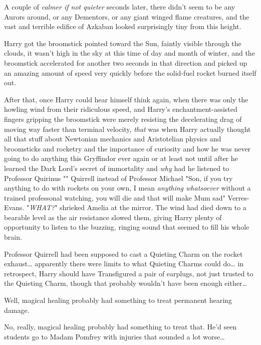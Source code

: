A couple of \emph{calmer if not quieter} seconds later, there didn't seem to be 
any Aurors around, or any Dementors, or any giant winged flame creatures, and 
the vast and terrible edifice of Azkaban looked surprisingly tiny from this 
height.

Harry got the broomstick pointed toward the Sun, faintly visible through the 
clouds, it wasn't high in the sky at this time of day and month of winter, and 
the broomstick accelerated for another two seconds in that direction and picked 
up an amazing amount of speed very quickly before the solid-fuel rocket burned 
itself out.

After that, once Harry could hear himself think again, when there was only the 
howling wind from their ridiculous speed, and Harry's enchantment-assisted 
fingers gripping the broomstick were merely resisting the decelerating drag of 
moving way faster than terminal velocity, \emph{that} was when Harry actually 
thought all that stuff about Newtonian mechanics and Aristotelian physics and 
broomsticks and rocketry and the importance of curiosity and how he was never 
going to do anything this Gryffindor ever again or at least not until after he 
learned the Dark Lord's secret of immortality and \emph{why} had he listened to 
Professor Quirinus "" Quirrell instead of Professor Michael 
"Son, if you try anything to do with rockets on your own, I mean \emph{anything 
whatsoever} without a trained professonal watching, you will die and that will 
make Mum sad" Verres-Evans.
\sbreak
"\emph{WHAT?}" shrieked Amelia at the mirror.
\sbreak
The wind had died down to a bearable level as the air resistance slowed them, 
giving Harry plenty of opportunity to listen to the buzzing, ringing sound that 
seemed to fill his whole brain.

Professor Quirrell had been supposed to cast a Quieting Charm on the rocket 
exhaust{\ldots} apparently there were limits to what Quieting Charms could 
do{\ldots} in retrospect, Harry should have Transfigured a pair of earplugs, 
not just trusted to the Quieting Charm, though that probably wouldn't have been 
enough either{\ldots}

Well, magical healing probably had something to treat permanent hearing damage.

No, really, magical healing probably had something to treat that. He'd seen 
students go to Madam Pomfrey with injuries that sounded a lot worse{\ldots}

